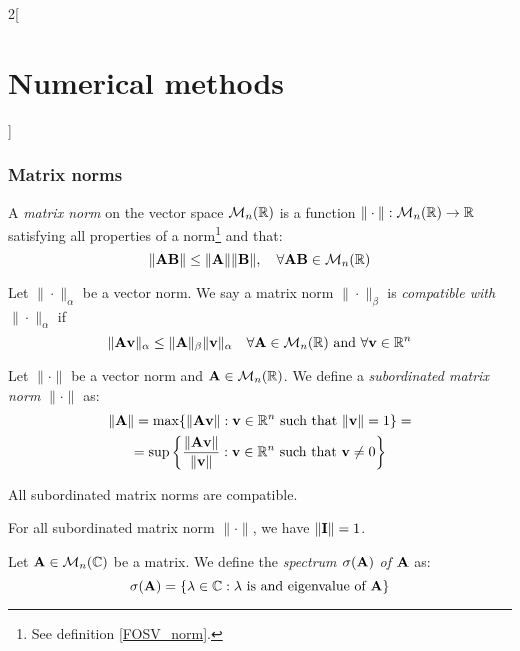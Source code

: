 \documentclass[../../../main.tex]{subfiles}
\begin{document}
\begin{multicols}{2}[\section{Numerical methods}]
  \subsubsection{Matrix norms}
  \begin{definition}
    A \textit{matrix norm} on the vector space $\mathcal{M}_n(\mathbb{R})$ is a function $\|\cdot\|:\mathcal{M}_n(\mathbb{R})\rightarrow\mathbb{R}$ satisfying all properties of a norm\footnote{See definition \ref{FOSV_norm}.} and that: $$\|\boldsymbol{\mathrm{A}}\boldsymbol{\mathrm{B}}\|\leq\|\boldsymbol{\mathrm{A}}\|\|\boldsymbol{\mathrm{B}}\|,\quad\forall \boldsymbol{\mathrm{A}}\boldsymbol{\mathrm{B}}\in\mathcal{M}_n(\mathbb{R})$$
  \end{definition}
  \begin{definition}
    Let $\|\cdot\|_\alpha$ be a vector norm. We say a matrix norm $\|\cdot\|_\beta$ is \textit{compatible with $\|\cdot\|_\alpha$} if $$\|\boldsymbol{\mathrm{A}}\boldsymbol{\mathrm{v}}\|_\alpha\leq\|\boldsymbol{\mathrm{A}}\|_\beta\|\boldsymbol{\mathrm{v}}\|_\alpha\quad\forall\boldsymbol{\mathrm{A}}\in\mathcal{M}_n(\mathbb{R})\text{ and }\forall\boldsymbol{\mathrm{v}}\in\mathbb{R}^n$$
  \end{definition}
  \begin{definition}
    Let $\|\cdot\|$ be a vector norm and $\boldsymbol{\mathrm{A}}\in\mathcal{M}_n(\mathbb{R})$. We define a \textit{subordinated matrix norm} $\|\cdot\|$ as:
    \begin{multline*}
      \|\boldsymbol{\mathrm{A}}\|=\max\{\|\boldsymbol{\mathrm{A}}\boldsymbol{\mathrm{v}}\|:\boldsymbol{\mathrm{v}}\in\mathbb{R}^n\text{ such that }\|\boldsymbol{\mathrm{v}}\|=1\}=\\=\sup\left\{\frac{\|\boldsymbol{\mathrm{A}}\boldsymbol{\mathrm{v}}\|}{\|\boldsymbol{\mathrm{v}}\|}:\boldsymbol{\mathrm{v}}\in\mathbb{R}^n\text{ such that }\boldsymbol{\mathrm{v}}\ne 0\right\}
    \end{multline*}
  \end{definition}
  \begin{lemma}
    All subordinated matrix norms are compatible.
  \end{lemma}
  \begin{lemma}
    For all subordinated matrix norm $\|\cdot\|$, we have $\|\boldsymbol{\mathrm{I}}\|=1$.
  \end{lemma}
  \begin{definition}
    Let $\boldsymbol{\mathrm{A}}\in\mathcal{M}_n(\mathbb{C})$ be a matrix. We define the \textit{spectrum $\sigma(\boldsymbol{\mathrm{A}})$ of $\boldsymbol{\mathrm{A}}$} as: $$\sigma(\boldsymbol{\mathrm{A}})=\{\lambda\in\mathbb{C}:\lambda\text{ is and eigenvalue of }\boldsymbol{\mathrm{A}}\}$$
  \end{definition}

\end{multicols}
\end{document}
